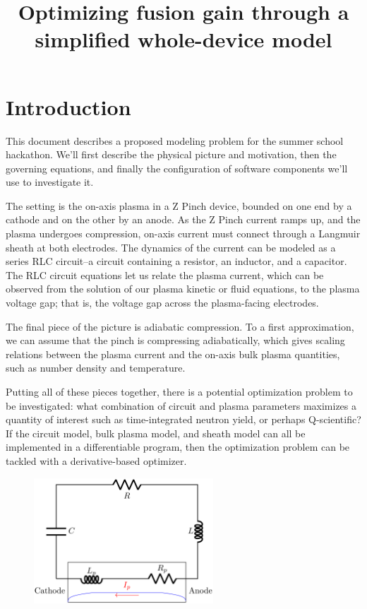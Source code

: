 \documentclass{article}
\title{Optimizing fusion gain through a simplified whole-device model}
\begin{document}
\maketitle

\section{Introduction}

This document describes a proposed modeling problem for the summer school hackathon.
We'll first describe the physical picture and motivation, then the governing equations, and finally
the configuration of software components we'll use to investigate it.

The setting is the on-axis plasma in a Z Pinch device, bounded on one end by a cathode and on the
other by an anode.
As the Z Pinch current ramps up, and the plasma undergoes compression, on-axis current must connect
through a Langmuir sheath at both electrodes.
The dynamics of the current can be modeled as a series RLC circuit--a circuit containing a resistor,
an inductor, and a capacitor.
The RLC circuit equations let us relate the plasma current, which can be observed from the solution
of our plasma kinetic or fluid equations, to the plasma voltage gap; that is, the voltage gap
across the plasma-facing electrodes.

The final piece of the picture is adiabatic compression. To a first approximation, we can assume
that the pinch is compressing adiabatically, which gives scaling relations between the plasma current
and the on-axis bulk plasma quantities, such as number density and temperature.

Putting all of these pieces together, there is a potential optimization problem to be investigated:
what combination of circuit and plasma parameters maximizes a quantity of interest such as time-integrated
neutron yield, or perhaps Q-scientific?
If the circuit model, bulk plasma model, and sheath model can all be implemented in a differentiable
program, then the optimization problem can be tackled with a derivative-based optimizer.

\begin{figure}
    \centering
    \includegraphics[width=0.6\textwidth]{images/circuit_diagram.pdf}
\end{figure}
\end{document}
